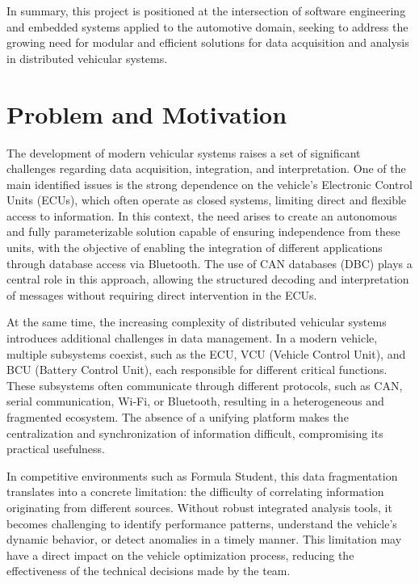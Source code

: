 In summary, this project is positioned at the intersection of software engineering and embedded systems applied to the automotive domain, seeking to address the growing need for modular and efficient solutions for data acquisition and analysis in distributed vehicular systems.\\


\section{Problem and Motivation}

The development of modern vehicular systems raises a set of significant challenges regarding data acquisition, integration, and interpretation. One of the main identified issues is the strong dependence on the vehicle’s Electronic Control Units (ECUs), which often operate as closed systems, limiting direct and flexible access to information. In this context, the need arises to create an autonomous and fully parameterizable solution capable of ensuring independence from these units, with the objective of enabling the integration of different applications through database access via Bluetooth. The use of CAN databases (DBC) plays a central role in this approach, allowing the structured decoding and interpretation of messages without requiring direct intervention in the ECUs.

At the same time, the increasing complexity of distributed vehicular systems introduces additional challenges in data management. In a modern vehicle, multiple subsystems coexist, such as the ECU, VCU (Vehicle Control Unit), and BCU (Battery Control Unit), each responsible for different critical functions. These subsystems often communicate through different protocols, such as CAN, serial communication, Wi-Fi, or Bluetooth, resulting in a heterogeneous and fragmented ecosystem. The absence of a unifying platform makes the centralization and synchronization of information difficult, compromising its practical usefulness.

In competitive environments such as Formula Student, this data fragmentation translates into a concrete limitation: the difficulty of correlating information originating from different sources. Without robust integrated analysis tools, it becomes challenging to identify performance patterns, understand the vehicle’s dynamic behavior, or detect anomalies in a timely manner. This limitation may have a direct impact on the vehicle optimization process, reducing the effectiveness of the technical decisions made by the team.


